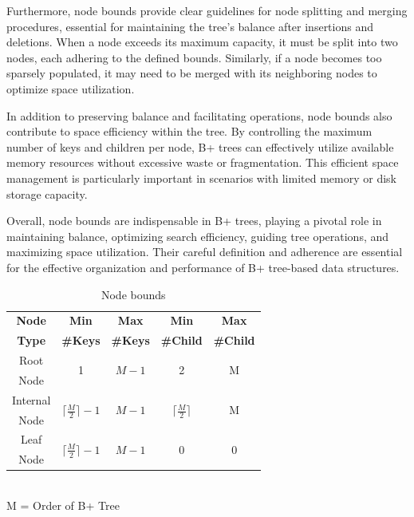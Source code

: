 \documentclass{article}
\begin{document}
Furthermore, node bounds provide clear guidelines for node splitting and merging procedures, essential for maintaining the tree's balance after insertions and deletions. When a node exceeds its maximum capacity, it must be split into two nodes, each adhering to the defined bounds. Similarly, if a node becomes too sparsely populated, it may need to be merged with its neighboring nodes to optimize space utilization.
\vspace{12pt}

In addition to preserving balance and facilitating operations, node bounds also contribute to space efficiency within the tree. By controlling the maximum number of keys and children per node, B+ trees can effectively utilize available memory resources without excessive waste or fragmentation. This efficient space management is particularly important in scenarios with limited memory or disk storage capacity.
\vspace{12pt}

Overall, node bounds are indispensable in B+ trees, playing a pivotal role in maintaining balance, optimizing search efficiency, guiding tree operations, and maximizing space utilization. Their careful definition and adherence are essential for the effective organization and performance of B+ tree-based data structures.

\begin{table}[ht]
\centering
\begin{tabular}{| c | c | c | c | c |}
    \hline
      \textbf{Node} & \textbf{Min} & \textbf{Max} & \textbf{Min} & \textbf{Max}\\
      \textbf{Type} &\textbf{\#Keys}&\textbf{\#Keys}& \textbf{\#Child}&\textbf{\#Child}\\
      \hline
      Root & \multirow{2}{*}{1}&\multirow{2}{*}{$M-1$}&\multirow{2}{*}{2\cite{navathe2010fundamentals}}&\multirow{2}{*}{M}\\
      Node & & & & \\
      \hline
       Internal& \multirow{2}{*}{$\lceil{\frac{M}{2}}\rceil - 1$ }&\multirow{2}{*}{$M-1$} &  \multirow{2}{*}{$\lceil{\frac{M}{2}}\rceil $ } & \multirow{2}{*}{M}\\
       Node& & & & \\
     \hline
     Leaf & \multirow{2}{*}{$\lceil{\frac{M}{2}}\rceil - 1 $ }&\multirow{2}{*}{$M-1$} & \multirow{2}{*}{0} & \multirow{2}{*}{0}\\
       Node& & & & \\
     \hline
\end{tabular}\\
M = Order of B+ Tree
\caption{Node bounds}
\end{table}
\end{document}
